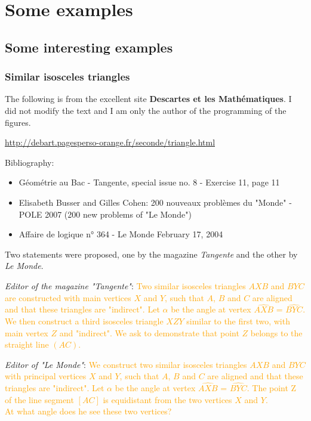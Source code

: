\section{Some examples}
\subsection{Some interesting examples}

\subsubsection{Similar isosceles triangles}

The following is from the excellent site \textbf{Descartes et les Mathématiques}. I did not modify the text and I am only the author of the programming of the figures.

\url{http://debart.pagesperso-orange.fr/seconde/triangle.html}

Bibliography:

\begin{itemize}

\item   Géométrie au Bac - Tangente, special issue no. 8 - Exercise 11, page 11


\item   Elisabeth Busser and Gilles Cohen: 200 nouveaux problèmes du "Monde" - POLE 2007 (200 new problems of "Le Monde")


\item   Affaire de logique n° 364 - Le Monde February 17, 2004
\end{itemize}


Two statements were proposed, one by the magazine \textit{Tangente} and the other by \textit{Le Monde}.

\vspace*{2cm}
\emph{Editor of the magazine "Tangente"}: \textcolor{orange}{Two similar isosceles triangles $AXB$ and $BYC$ are constructed with main vertices $X$ and $Y$, such that $A$, $B$ and $C$ are aligned and that these triangles are "indirect". Let $\alpha$ be the angle at vertex $\widehat{AXB}$ = $\widehat{BYC}$. We then construct a third isosceles triangle $XZY$ similar to the first two, with main vertex $Z$ and "indirect".
We ask to demonstrate that point $Z$ belongs to the straight line $(AC)$.}

\vspace*{2cm}
\emph{Editor of  "Le Monde"}: \textcolor{orange}{We construct two similar isosceles triangles $AXB$ and $BYC$ with principal vertices $X$ and $Y$, such that $A$, $B$ and $C$ are aligned and that these triangles are "indirect". Let $\alpha$ be the angle at vertex $\widehat{AXB}$ = $\widehat{BYC}$. The point Z of the line segment $[AC]$ is equidistant from the two vertices $X$ and $Y$.\\
At what angle does he see these two vertices?}

